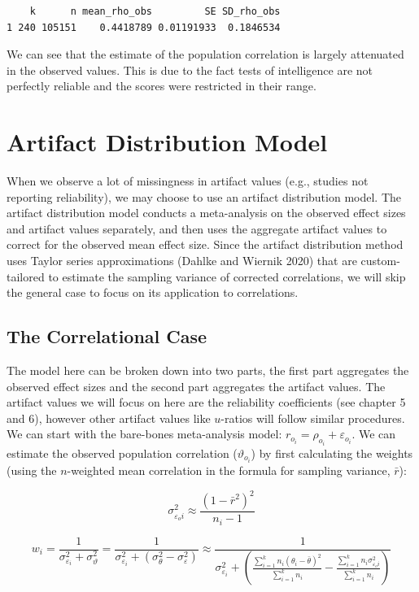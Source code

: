 \documentclass[
  letterpaper,
  DIV=11,
  numbers=noendperiod]{scrreprt}
\begin{document}
\begin{verbatim}
    k      n mean_rho_obs         SE SD_rho_obs
1 240 105151    0.4418789 0.01191933  0.1846534
\end{verbatim}

We can see that the estimate of the population correlation is largely
attenuated in the observed values. This is due to the fact tests of
intelligence are not perfectly reliable and the scores were restricted
in their range.

\hypertarget{artifact-distribution-model}{%
\section{Artifact Distribution
Model}\label{artifact-distribution-model}}

When we observe a lot of missingness in artifact values (e.g., studies
not reporting reliability), we may choose to use an artifact
distribution model. The artifact distribution model conducts a
meta-analysis on the observed effect sizes and artifact values
separately, and then uses the aggregate artifact values to correct for
the observed mean effect size. Since the artifact distribution method
uses Taylor series approximations (Dahlke and Wiernik 2020) that are
custom-tailored to estimate the sampling variance of corrected
correlations, we will skip the general case to focus on its application
to correlations.

\hypertarget{the-correlational-case}{%
\subsection{The Correlational Case}\label{the-correlational-case}}

The model here can be broken down into two parts, the first part
aggregates the observed effect sizes and the second part aggregates the
artifact values. The artifact values we will focus on here are the
reliability coefficients (see chapter 5 and 6), however other artifact
values like \(u\)-ratios will follow similar procedures. We can start
with the bare-bones meta-analysis model:
\(r_{o_i} = \rho_{o_i} + \varepsilon_{o_i}\). We can estimate the
observed population correlation (\(\vartheta_{o_i}\)) by first
calculating the weights (using the \(n\)-weighted mean correlation in
the formula for sampling variance, \(\bar{r}\)):

\[
\sigma^2_{\varepsilon_oi} \approx \frac{(1-\bar{r}^2)^2}{n_i-1} 
\]

\[
w_i = \frac{1}{\sigma^2_{\varepsilon_i}+\sigma_\vartheta^2} = \frac{1}{\sigma^2_{\varepsilon_i}+(\sigma^2_{\theta}-\sigma^2_{\varepsilon})} \approx \frac{1}{\sigma^2_{\varepsilon_i}+\left(\frac{\sum^k_{i=1}n_i(\theta_i - \bar{\theta})^2}{\sum^k_{i=1}n_i}-\frac{\sum^k_{i=1}n_i\sigma^2_{\varepsilon_oi}}{\sum^k_{i=1}n_i}\right)}
\]
\end{document}
